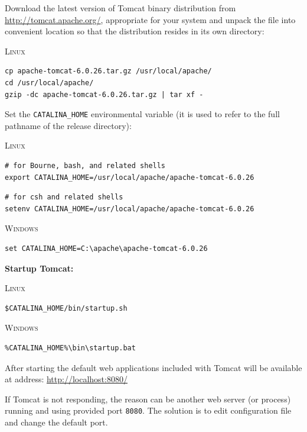 Download the latest version of Tomcat binary distribution from \url{http://tomcat.apache.org/}, appropriate for your system and unpack the file into convenient location so that the distribution resides in its own directory:

\bigskip

{\scshape Linux}
\begin{verbatim}
cp apache-tomcat-6.0.26.tar.gz /usr/local/apache/
cd /usr/local/apache/
gzip -dc apache-tomcat-6.0.26.tar.gz | tar xf -
\end{verbatim}

\bigskip

Set the \texttt{CATALINA\_HOME} environmental variable (it is used to refer to the full pathname of the release directory):

\bigskip

{\scshape Linux}
\begin{verbatim}
# for Bourne, bash, and related shells
export CATALINA_HOME=/usr/local/apache/apache-tomcat-6.0.26
\end{verbatim}
\begin{verbatim}
# for csh and related shells
setenv CATALINA_HOME=/usr/local/apache/apache-tomcat-6.0.26
\end{verbatim}

{\scshape Windows}
\begin{verbatim}
set CATALINA_HOME=C:\apache\apache-tomcat-6.0.26
\end{verbatim}

\bigskip

{\large\textbf{Startup Tomcat:}}

\bigskip

{\scshape Linux}
\begin{verbatim}
$CATALINA_HOME/bin/startup.sh
\end{verbatim}

{\scshape Windows}
\begin{verbatim}
%CATALINA_HOME%\bin\startup.bat
\end{verbatim}

After starting the default web applications included with Tomcat will be available at address: \url{http://localhost:8080/}

\bigskip

\begin{framed}
If Tomcat is not responding, the reason can be another web server (or process) running and using provided port \texttt{8080}. The solution is to edit  configuration file and change the default port.
\end{framed}

